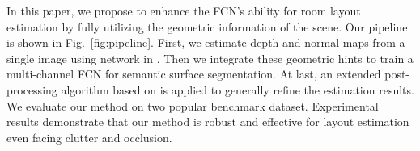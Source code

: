 In this paper, we propose to enhance the FCN's ability for room layout estimation by fully utilizing the geometric information of the scene. Our pipeline is shown in Fig.~\ref{fig:pipeline}. First, we estimate depth and normal maps from a single image using network in \cite{eigen2015predicting}. Then we integrate these geometric hints to train a multi-channel FCN for semantic surface segmentation. At last, an extended post-processing algorithm based on \cite{dasgupta2016delay} is applied to generally refine the estimation results. We evaluate our method on two popular benchmark dataset. Experimental results demonstrate that our method is robust and effective for layout estimation even facing clutter and occlusion.






